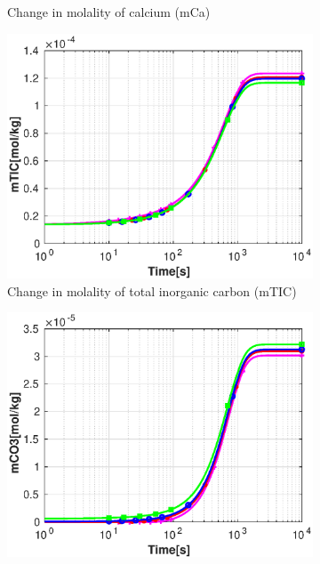 \begin{figure}[!h]
\begin{subfigure}{.5\linewidth}
        \caption{Change in molality of calcium (mCa)}
        \label{fig:withoutvelmCa}       %
    \end{subfigure}%
        \hfill
    \begin{subfigure}{.5\linewidth}
        \centering
        \includegraphics[width=\textwidth]{PICTURES/without_vel_mTIC.eps}
        \caption{Change in molality of total inorganic carbon (mTIC)}
        \label{fig:withoutvelmTIC}
    \end{subfigure}%
    \hfill
    \begin{subfigure}{.5\linewidth}
        \centering
        \includegraphics[width=\textwidth]{PICTURES/without_vel_mCO3.eps}

\end{subfigure}
\end{figure}
